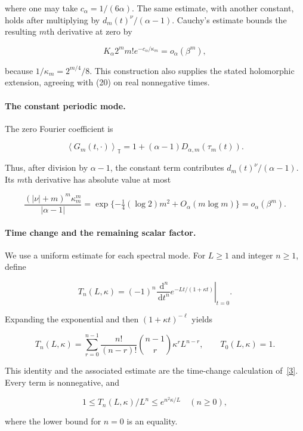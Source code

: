 \documentclass[
  11pt,
]{article}
\begin{document}
where one may take \(c_\alpha=1/(6\alpha)\). The same estimate, with
another constant, holds after multiplying by \(d_m(t)^\nu/(\alpha-1)\).
Cauchy's estimate bounds the resulting \(m\)th derivative at zero by

\[
K_\alpha 2^m m! e^{-c_\alpha/\kappa_m}=o_\alpha(\beta^m),
\]

because \(1/\kappa_m=2^{m/4}/8\). This construction also supplies the
stated holomorphic extension, agreeing with (20) on real nonnegative
times.

\paragraph{The constant periodic
mode.}\label{the-constant-periodic-mode.}

The zero Fourier coefficient is

\[
\left\langle G_m(t,\cdot)\right\rangle_{\mathbb T}=1+(\alpha-1)D_{\alpha,m}(\tau_m(t)).
\]

Thus, after division by \(\alpha-1\), the constant term contributes
\(d_m(t)^\nu/(\alpha-1)\). Its \(m\)th derivative has absolute value at
most

\[
\frac{(|\nu|+m)^m\kappa_m^m}{|\alpha-1|}
 =\exp\{-\tfrac14(\log2)m^2+O_\alpha(m\log m)\}
 =o_\alpha(\beta^m).
\]

\paragraph{Time change and the remaining scalar
factor.}\label{time-change-and-the-remaining-scalar-factor.}

We use a uniform estimate for each spectral mode. For \(L\geq1\) and
integer \(n\geq1\), define

\[
T_n(L,\kappa)=
 (-1)^n\left.\frac{\,\mathrm d^n}{\,\mathrm dt^n}
        e^{-Lt/(1+\kappa t)}\right|_{t=0}.
\]

Expanding the exponential and then \((1+\kappa t)^{-\ell}\) yields

\[
\tag{24}
 T_n(L,\kappa)=
 \sum_{r=0}^{n-1}\frac{n!}{(n-r)!}
       \binom{n-1}{r}\kappa^r L^{n-r},
 \qquad T_0(L,\kappa)=1.
\]

This identity and the associated estimate are the time-change
calculation of~\href{https://arxiv.org/abs/2608.30275v1}{{[}3{]}}. Every
term is nonnegative, and

\[
\tag{25}
 1\leq T_n(L,\kappa)/L^n\leq e^{n^2\kappa/L}
 \quad(n\geq0),
\]

where the lower bound for \(n=0\) is an equality.
\end{document}
